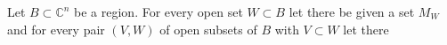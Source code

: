 Let $B \subset \mathbb{C}^n$ be a region. For every open set $W \subset B$ let there be given a set $M_W$ and for every pair $(V, W)$ of open subsets of $B$ with $V \subset W$ let there

